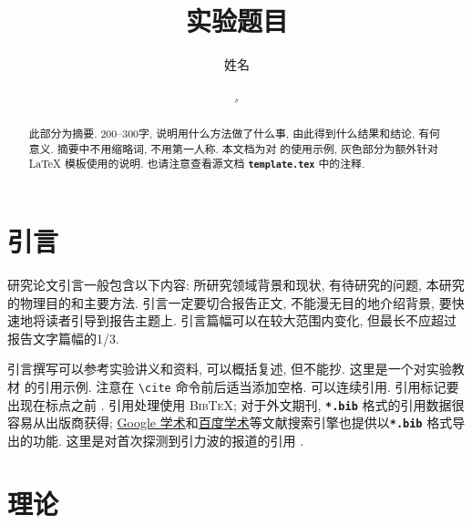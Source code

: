\documentclass[font=notofandol]{mpltx}
\makeatletter
\newcommand{\note}[1]{{\color{gray}#1}}
\newcommand*\cs[1]{\texttt{\textbackslash #1}}
\newcommand*\file[1]{\textbf{\texttt{#1}}}
\newcommand\releasedate{%
    \href{https://github.com/CastleStar14654/PKUMpLtX/releases/tag/\mpltx@fileversion}%
        {\mpltx@filedate, \mpltx@fileversion}}
\makeatother
\begin{document}
\title{实验题目} %
\author{姓名} %
\date{\releasedate}
\begin{abstract}
  此部分为摘要.
  200--300字, 说明用什么方法做了什么事, 由此得到什么结果和结论, 有何意义.
  摘要中不用缩略词, 不用第一人称.
  \note{本文档为对 \href{https://github.com/CastleStar14654/PKUMpLtX}{\pkg*{PKUMpLtX}} 的使用示例, 灰色部分为额外针对 \LaTeX{} 模板使用的说明.
    也请注意查看源文档 \file{template.tex} 中的注释.}
\end{abstract}

\maketitle

\section{引言}

研究论文引言一般包含以下内容:
所研究领域背景和现状,
有待研究的问题,
本研究的物理目的和主要方法.
引言一定要切合报告正文, 不能漫无目的地介绍背景, 要快速地将读者引导到报告主题上.
引言篇幅可以在较大范围内变化, 但最长不应超过报告文字篇幅的1/3.

引言撰写可以参考实验讲义和资料, 可以概括复述, 但不能抄.
\note{这里是一个对实验教材 \cite{jindaishiyan} 的引用示例.}
\note{注意在 \cs{cite} 命令前后适当添加空格.
  可以连续引用.
  引用标记要出现在标点之前 \cite{GBT7714,pr}.
  引用处理使用 \textsc{Bib\TeX};
  对于外文期刊, \file{*.bib} 格式的引用数据很容易从出版商获得;
  \href{https://scholar.google.com}{Google 学术}和\href{https://xueshu.baidu.com}{百度学术}等文献搜索引擎也提供以\file{*.bib} 格式导出的功能.
  这里是对首次探测到引力波的报道的引用 \cite{PhysRevLett.116.061102}.}

\section{理论}\label{sec:theory}
\end{document}
